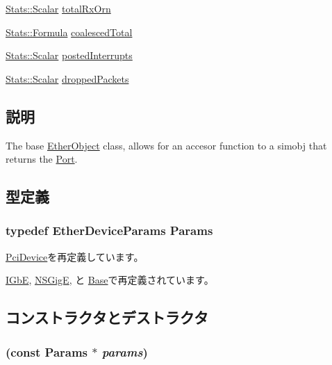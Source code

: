 \begin{DoxyCompactItemize}
\item 
\hyperlink{classStats_1_1Scalar}{Stats::Scalar} \hyperlink{classEtherDevice_a0708de0a6aa4276362e62a373d0ec171}{totalRxOrn}
\item 
\hyperlink{classStats_1_1Formula}{Stats::Formula} \hyperlink{classEtherDevice_a984c3dc7d96eb56317f45a83b847bafc}{coalescedTotal}
\item 
\hyperlink{classStats_1_1Scalar}{Stats::Scalar} \hyperlink{classEtherDevice_a4d094aae7f845e257eb7b71943dbf578}{postedInterrupts}
\item 
\hyperlink{classStats_1_1Scalar}{Stats::Scalar} \hyperlink{classEtherDevice_af8b73f26b4e34a72f2987ba179173ca8}{droppedPackets}
\end{DoxyCompactItemize}


\subsection{説明}
The base \hyperlink{classEtherObject}{EtherObject} class, allows for an accesor function to a simobj that returns the \hyperlink{classPort}{Port}. 

\subsection{型定義}
\hypertarget{classEtherDevice_afcf43c7944288000e850f783bdd66b9d}{
\subsubsection[{Params}]{\setlength{\rightskip}{0pt plus 5cm}typedef EtherDeviceParams {\bf Params}}}
\label{classEtherDevice_afcf43c7944288000e850f783bdd66b9d}


\hyperlink{classPciDevice_aefbfd3f2d9daf3173b779eeff32e8112}{PciDevice}を再定義しています。

\hyperlink{classIGbE_ad27b5cfed87f35a483863a73336d8258}{IGbE}, \hyperlink{classNSGigE_a3d96e676dc626c146631b6fa53a9d823}{NSGigE}, と \hyperlink{classSinic_1_1Base_ae32fbee6dea75ffbb01b7d869c7bedad}{Base}で再定義されています。

\subsection{コンストラクタとデストラクタ}
\hypertarget{classEtherDevice_a6f5090c40cfd553717f2e6048e0246cc}{
\subsubsection[{EtherDevice}]{ (const {\bf Params} $\ast$ {\em params})}}
\label{classEtherDevice_a6f5090c40cfd553717f2e6048e0246cc}



